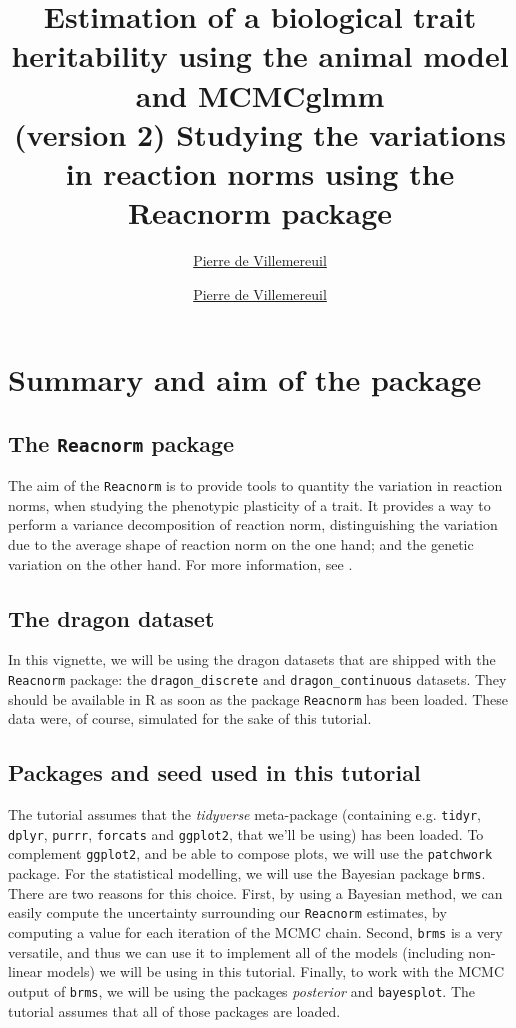 \documentclass[a4paper,12pt,twoside]{article}
\title{
  \tcbox[colback=themecolor,colframe=themecolor]{\color{white}Tutorial} 
  Estimation of a biological trait heritability using the animal model and MCMCglmm\\
  \large{(version 2)}
}
\author[Pierre de Villemereuil]{\href{mailto:pierre.de-villemereuil@mnhn.fr}{Pierre de Villemereuil}}
\author{\href{mailto:pierre.de-villemereuil@mnhn.fr}{Pierre de Villemereuil}}
\title{Studying the variations in reaction norms using the Reacnorm package}
\begin{document}
\maketitle

\tableofcontents

\newpage

\section{Summary and aim of the package}

\subsection{The \texttt{Reacnorm} package}

The aim of the \texttt{Reacnorm} is to provide tools to quantity the variation in reaction norms, when studying the phenotypic plasticity of a trait. It provides a way to perform a variance decomposition of reaction norm, distinguishing the variation due to the average shape of reaction norm on the one hand; and the genetic variation on the other hand. For more information, see \textcite{devillemereuil_general_2016}.

\subsection{The dragon dataset}

In this vignette, we will be using the dragon datasets that are shipped with the \texttt{Reacnorm} package: the \texttt{dragon\_discrete} and \texttt{dragon\_continuous} datasets. They should be available in R as soon as the package \texttt{Reacnorm} has been loaded.
These data were, of course, simulated for the sake of this tutorial.

\subsection{Packages and seed used in this tutorial}

The tutorial assumes that the \textit{tidyverse} meta-package (containing e.g. \texttt{tidyr}, \texttt{dplyr}, \texttt{purrr}, \texttt{forcats} and \texttt{ggplot2}, that we'll be using) has been loaded.
To complement \texttt{ggplot2}, and be able to compose plots, we will use the \texttt{patchwork} package. For the statistical modelling, we will use the Bayesian package \texttt{brms}. 
There are two reasons for this choice. First, by using a Bayesian method, we can easily compute the uncertainty surrounding our \texttt{Reacnorm} estimates, by computing a value for each iteration of the MCMC chain. Second, \texttt{brms} is a very versatile, and thus we can use it to implement all of the models (including non-linear models) we will be using in this tutorial.
Finally, to work with the MCMC output of \texttt{brms}, we will be using the packages \textit{posterior} and \texttt{bayesplot}.
The tutorial assumes that all of those packages are loaded.
\end{document}

